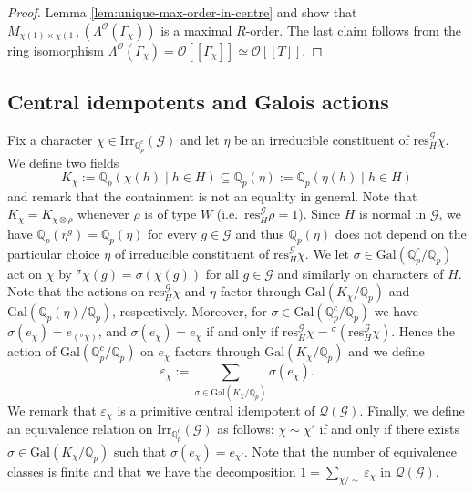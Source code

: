 \documentclass[12pt]{amsart}
\theoremstyle{plain}
\theoremstyle{remark}
\theoremstyle{definition}
\numberwithin{equation}{section}
\begin{document}
\begin{proof}
Lemma \ref{lem:unique-max-order-in-centre} and \cite[Theorem 8.7]{MR1972204} show that
$M_{\chi(1) \times \chi(1)}(\Lambda^{\mathcal{O}}(\Gamma_{\chi}))$ is a maximal $R$-order.
The last claim follows from the ring isomorphism $\Lambda^{\mathcal{O}}(\Gamma_{\chi}) = \mathcal{O}[[\Gamma_{\chi}]] \simeq \mathcal{O}[[T]]$.
\end{proof}

\subsection{Central idempotents and Galois actions}\label{subset:idem-gal-actions}
Fix a character $\chi \in {\mathrm{Irr}}_{{\mathbb{Q}}_{p}^{c}}(\mathcal{G})$ and let $\eta$ be an irreducible constituent of
${\mathrm{res}}^{\mathcal{G}}_{H} \chi$.
We define two fields
\[
K_{\chi} := {\mathbb{Q}}_{p}(\chi(h) \mid h \in H) \subseteq {\mathbb{Q}}_{p}(\eta) := {\mathbb{Q}}_{p}(\eta(h) \mid h \in H)
\]
and remark that the containment is not an equality in general.
Note that $K_{\chi} = K_{\chi \otimes \rho}$ whenever $\rho$ is of type $W$ (i.e.~${\mathrm{res}}^{\mathcal{G}}_{H} \rho = 1$).
Since $H$ is normal in $\mathcal{G}$, we have ${\mathbb{Q}}_{p}(\eta^{g}) = {\mathbb{Q}}_{p}(\eta)$ for every $g \in \mathcal{G}$ and thus
${\mathbb{Q}}_{p}(\eta)$ does not depend on the particular choice $\eta$ of irreducible constituent of ${\mathrm{res}}^{\mathcal{G}}_{H}\chi$.
We let $\sigma \in {\mathrm{Gal}}({\mathbb{Q}}_{p}^{c}/{\mathbb{Q}}_{p})$ act on $\chi$ by ${}^{\sigma}\chi(g) = \sigma(\chi(g))$ for all $g \in \mathcal{G}$
and similarly on characters of $H$. Note that the actions on ${\mathrm{res}}^{\mathcal{G}}_{H}\chi$ and $\eta$ factor through
${\mathrm{Gal}}(K_{\chi}/{\mathbb{Q}}_{p})$ and ${\mathrm{Gal}}({\mathbb{Q}}_{p}(\eta)/{\mathbb{Q}}_{p})$, respectively.
Moreover, for $\sigma \in {\mathrm{Gal}}({\mathbb{Q}}_{p}^{c}/{\mathbb{Q}}_{p})$ we have $\sigma(e_{\chi})=e_{({}^{\sigma}\chi)}$,
and $\sigma(e_{\chi})=e_{\chi}$ if and only if ${\mathrm{res}}^{\mathcal{G}}_{H}\chi = {}^{\sigma}({\mathrm{res}}^{\mathcal{G}}_{H}\chi)$.
Hence the action of ${\mathrm{Gal}}({\mathbb{Q}}_{p}^{c}/{\mathbb{Q}}_{p})$ on $e_{\chi}$ factors through ${\mathrm{Gal}}(K_{\chi}/{\mathbb{Q}}_{p})$ and we define
\[
\varepsilon_{\chi} := \sum_{\sigma \in {\mathrm{Gal}}(K_{\chi} / {\mathbb{Q}}_{p})} \sigma(e_{\chi}).
\]
We remark that $\varepsilon_{\chi}$ is a primitive central idempotent of $\mathcal{Q}(\mathcal{G})$.
Finally, we define an equivalence relation on ${\mathrm{Irr}}_{{\mathbb{Q}}_{p}^{c}}(\mathcal{G})$ as follows:
$\chi \sim \chi'$ if and only if there exists $\sigma \in {\mathrm{Gal}}(K_{\chi}/{\mathbb{Q}}_{p})$ such that $\sigma(e_{\chi})=e_{\chi'}$.
Note that the number of equivalence classes is finite and
that we have the decomposition $1 = \sum_{\chi/\sim} \varepsilon_{\chi}$ in $\mathcal{Q}(\mathcal{G})$.
\end{document}
